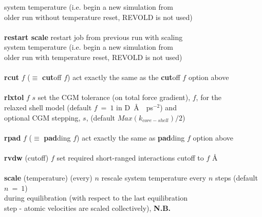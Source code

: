 \begin{tabbing}
\>                                              \> system temperature (i.e. begin a new simulation from \\
\>                                              \> older run without temperature reset, REVOLD is not used) \\
\>                                              \> \\
\> {\bf restart scale}                          \> restart job from previous run with scaling \\
\>                                              \> system temperature (i.e. begin a new simulation from \\
\>                                              \> older run with temperature reset, REVOLD is not used) \\
\>                                              \> \\
\> {\bf rcut} $f$  ($\equiv$ {\bf cut}off $f$)  \> act exactly the same as the {\bf cut}off $f$ option above \\
\>                                              \> \\
\> {\bf rlxtol} $f$ $s$                         \> set the CGM tolerance (on total force gradient), $f$, for the \\
\>                                              \> relaxed shell model (default $f~=~1$ in D~\AA~~ps$^{-2}$) and \\
\>                                              \> optional CGM stepping, $s$, (default $Max(k_{core-shell})/2$) \\
\>                                              \> \\
\> {\bf rpad} $f$  ($\equiv$ {\bf pad}ding $f$) \> act exactly the same as {\bf pad}ding $f$ option above \\
\>                                              \> \\
\> {\bf rvdw} (cutoff) $f$                      \> set required short-ranged interactions cutoff to $f$ \AA \\
\>                                              \> \\
\> {\bf scale} (temperature) (every) $n$        \> rescale system temperature every $n$ steps (default $n~=~1$) \\
\>                                              \> during equilibration (with respect to the last equilibration \\
\>                                              \> step - atomic velocities are scaled collectively), {\bf N.B.} \\

\end{tabbing}
